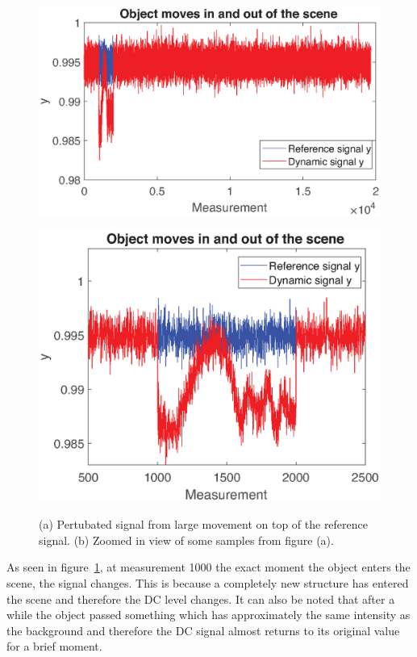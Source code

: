 \begin{figure}[H]
    \centering
\begin{minipage}[t]{0.53\textwidth}
    \includegraphics[width=1\textwidth]{result/dynamic/fly/flyby_sig1.eps}
    \subcaption{}
    \label{fig:fly_sig_1}
\end{minipage}
\begin{minipage}[t]{0.46\textwidth}
    \includegraphics[width = \textwidth]{result/dynamic/fly/flyby_plot_win1.eps}
    \subcaption{}
    \label{fig:fly_sig_2}
\end{minipage}
    \caption{(a) Pertubated signal from large movement on top of the reference signal. (b) Zoomed in view of some samples from figure (a).}
    \label{fig:fly_sig}
\end{figure}

As seen in figure~\ref{fig:fly_sig}, at measurement 1000 the exact moment the object enters the scene, the signal changes. This is because a completely new structure has entered the scene and therefore the DC level changes. It can also be noted that after a while the object passed something which has approximately the same intensity as the background and therefore the DC signal almost returns to its original value for a brief moment.\\[0.1in] 

